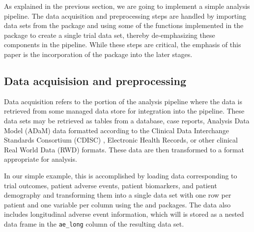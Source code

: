 As explained in the previous section, we are going to implement a simple
analysis pipeline. The data acquisition and preprocessing steps are
handled by importing data sets from the  package and using
some of the functions implemented in the package to create a single
trial data set, thereby de-emphasizing these components in the pipeline.
While these steps are critical, the emphasis of this paper is the
incorporation of the  package into the later stages.

\hypertarget{data-acquisision-and-preprocessing}{%
\subsection{Data acquisision and
preprocessing}\label{data-acquisision-and-preprocessing}}

Data acquisition refers to the portion of the analysis pipeline where
the data is retrieved from some managed data store for integration into
the pipeline. These data sets may be retrieved as tables from a
database, case reports, Analysis Data Model (ADaM) data formatted
according to the Clinical Data Interchange Standards Consortium (CDISC)
\citep{CDISC}, Electronic Health Records, or other clinical Real World
Data (RWD) formats. These data are then transformed to a format
appropriate for analysis.

In our simple example, this is accomplished by loading data
corresponding to trial outcomes, patient adverse events, patient
biomarkers, and patient demography and transforming them into a single
data set with one row per patient and one variable per column using the
 and  \citep{dplyr} packages. The data also
includes longitudinal adverse event information, which will is stored as
a nested data frame in the \texttt{ae\_long} column of the resulting
data set.

